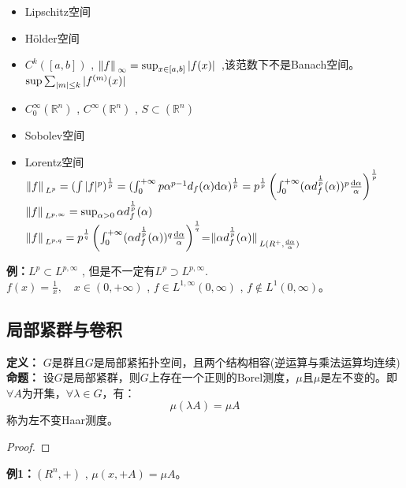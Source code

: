 \begin{itemize}
    \item Lipschitz空间
    \item H{\"o}lder空间
    \item $C^k([a,b])$ , $\norm*{f}_{\infty}=\sup_{x\in[a,b]}\abs*{f(x)}$ ,该范数下不是Banach空间。\\$\sup\sum_{|m|\leq k}\abs*{f^{(m)}(x)}$
    \item $C_0^{\infty}(\mathbb{R}^n)$ , $C^{\infty}(\mathbb{R}^n)$ , $S\subset(\mathbb{R}^n)$
    \item Sobolev空间
    \item Lorentz空间\\
    $\norm*{f}_{L^p}=(\int|f|^p)^{\frac{1}{p}}=(\int_0^{+\infty}p\alpha^{p-1}d_f(\alpha)\dd \alpha)^{\frac{1}{p}}=p^{\frac{1}{p}}\left(\int_0^{+\infty} (\alpha d_f^{\frac{1}{p}}(\alpha))^p \frac{\dd \alpha}{\alpha} \right)^{\frac{1}{p}}$\\
    $\norm*{f}_{L^{p,\infty}}=\sup_{\alpha>0}\alpha d_f^{\frac{1}{p}}(\alpha)$\\
    $\norm*{f}_{L^{p,q}}=p^{\frac{1}{q}}\left(\int_0^{+\infty} (\alpha d_f^{\frac{1}{p}}(\alpha))^q \frac{\dd \alpha}{\alpha} \right)^{\frac{1}{q}}$=$\norm*{\alpha d_f^{\frac{1}{p}}(\alpha)}_{L(R^+,\frac{\dd \alpha}{\alpha})}$
\end{itemize}

{\bfseries \large 例：}$L^p\subset L^{p,\infty}$ , 但是不一定有$L^p\supset L^{p,\infty}$.
\\
$f(x)=\frac{1}{x},\quad x\in (0,+\infty)$ , $f\in L^{1,\infty}(0,\infty)$ , $f\not\in L^1(0,\infty)$。

\subsection{局部紧群与卷积}

{\bfseries \large 定义：} $G$是群且$G$是局部紧拓扑空间，且两个结构相容(逆运算与乘法运算均连续)
\\
{\bfseries \large 命题：}
设$G$是局部紧群，则$G$上存在一个正则的Borel测度，$\mu$且$\mu$是左不变的。即$\forall A$为开集，$\forall \lambda\in G$，有：
\begin{equation*}
    \mu(\lambda A)=\mu A
\end{equation*}
称为左不变Haar测度。
\begin{proof}
    
\end{proof}

{\bfseries \large 例1：}$(R^n,+)$ , $\mu(x,+A)=\mu A$。

